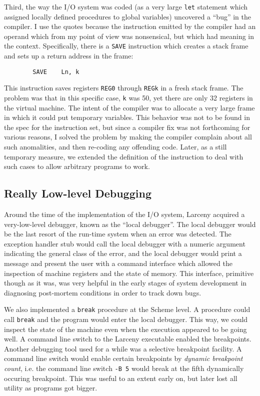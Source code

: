Third, the way the I/O system was coded (as a very large {\tt let} statement
which assigned locally defined procedures to global variables) uncovered a
``bug'' in the compiler. I use the quotes because the instruction emitted
by the compiler had an operand which from my point of view was nonsensical,
but which had meaning in the context. Specifically, there is a 
{\tt SAVE} instruction which creates a stack frame and sets up a return 
address in the frame:

\begin{verbatim}
        SAVE    Ln, k
\end{verbatim}

This instruction saves registers {\tt REG0} through {\tt REGk} in a fresh
stack frame. The problem was that in this specific case, {\tt k} was 50, yet
there are only 32 registers in the virtual machine. The intent of the
compiler was to allocate a very large frame in which it could put temporary
variables. This behavior was not to be found in the spec for the instruction
set, but since a compiler fix was not forthcoming for various reasons, I
solved the problem by making the compiler complain about all such
anomalities, and then re-coding any offending code. Later, as a still
temporary measure, we extended the definition of the instruction to deal
with such cases to allow arbitrary programs to work.

\subsection{Really Low-level Debugging}

Around the time of the implementation of the I/O system, Larceny acquired a
very-low-level debugger, known as the ``local debugger''. The local debugger
would be the last resort of the run-time system when an error was detected.
The exception handler stub would call the local debugger with a numeric
argument indicating the general class of the error, and the local debugger
would print a message and present the user with a command interface which
allowed the inspection of machine registers and the state of memory. This
interface, primitive though as it was, was very helpful in the early stages
of system development in diagnosing post-mortem conditions in order to track
down bugs.

We also implemented a {\tt break} procedure at the Scheme level. A procedure
could call {\tt break} and the program would enter the local debugger. This
way, we could inspect the state of the machine even when the
execution appeared to be going well. A command line switch to the Larceny
executable enabled the breakpoints.
Another debugging tool used for a while was a selective breakpoint facility.
A command line switch would enable certain breakpoints by {\em dynamic
breakpoint count}, i.e. the command line switch \verb+-B 5+ would break at
the fifth dynamically occuring breakpoint. This was useful to an extent
early on, but later lost all utility as programs got bigger.

